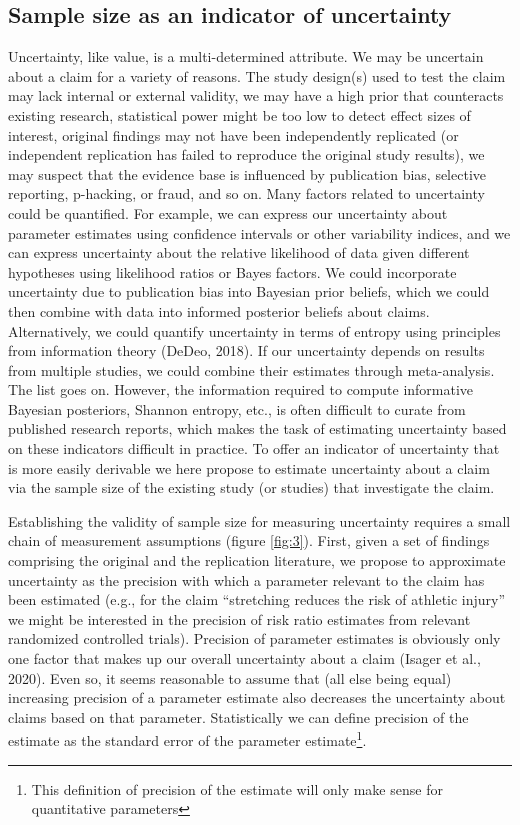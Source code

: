 \documentclass[
  english,
  jou,floatsintext]{apa6}
\begin{document}
\hypertarget{sample-size-as-an-indicator-of-uncertainty}{%
\subsection{Sample size as an indicator of uncertainty}\label{sample-size-as-an-indicator-of-uncertainty}}

Uncertainty, like value, is a multi-determined attribute. We may be uncertain about a claim for a variety of reasons. The study design(s) used to test the claim may lack internal or external validity, we may have a high prior that counteracts existing research, statistical power might be too low to detect effect sizes of interest, original findings may not have been independently replicated (or independent replication has failed to reproduce the original study results), we may suspect that the evidence base is influenced by publication bias, selective reporting, p-hacking, or fraud, and so on. Many factors related to uncertainty could be quantified. For example, we can express our uncertainty about parameter estimates using confidence intervals or other variability indices, and we can express uncertainty about the relative likelihood of data given different hypotheses using likelihood ratios or Bayes factors. We could incorporate uncertainty due to publication bias into Bayesian prior beliefs, which we could then combine with data into informed posterior beliefs about claims. Alternatively, we could quantify uncertainty in terms of entropy using principles from information theory (DeDeo, 2018). If our uncertainty depends on results from multiple studies, we could combine their estimates through meta-analysis. The list goes on. However, the information required to compute informative Bayesian posteriors, Shannon entropy, etc., is often difficult to curate from published research reports, which makes the task of estimating uncertainty based on these indicators difficult in practice. To offer an indicator of uncertainty that is more easily derivable we here propose to estimate uncertainty about a claim via the sample size of the existing study (or studies) that investigate the claim.

Establishing the validity of sample size for measuring uncertainty requires a small chain of measurement assumptions (figure \ref{fig:3}). First, given a set of findings comprising the original and the replication literature, we propose to approximate uncertainty as the precision with which a parameter relevant to the claim has been estimated (e.g., for the claim ``stretching reduces the risk of athletic injury'' we might be interested in the precision of risk ratio estimates from relevant randomized controlled trials). Precision of parameter estimates is obviously only one factor that makes up our overall uncertainty about a claim (Isager et al., 2020). Even so, it seems reasonable to assume that (all else being equal) increasing precision of a parameter estimate also decreases the uncertainty about claims based on that parameter. Statistically we can define precision of the estimate as the standard error of the parameter estimate\footnote{This definition of precision of the estimate will only make sense for quantitative parameters}.
\end{document}

